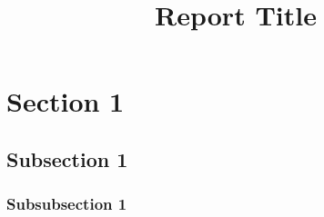\documentclass[11pt]{article}
\begin{document}
    \title{Report Title}
    \maketitle

    \section{Section 1}

    \subsection{Subsection 1}

    \subsubsection{Subsubsection 1}
\end{document}
